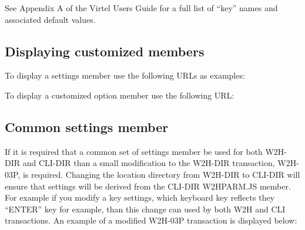 \documentclass[letterpaper,10pt,english]{sphinxmanual}
\begin{document}
\begin{sphinxVerbatim}[commandchars=\\\{\}]
  
\end{sphinxVerbatim}

See Appendix A of the Virtel Users Guide for a full list of “key” names and associated default values.

\ignorespaces 

\subsection{Displaying customized members}
\label{\detokenize{Customization:displaying-customized-members}}\label{\detokenize{Customization:index-1}}
To display a settings member use the following URLs as examples:

\begin{sphinxVerbatim}[commandchars=\\\{\}]
\end{sphinxVerbatim}


To display a customized option member use the following URL:

\begin{sphinxVerbatim}[commandchars=\\\{\}]
\end{sphinxVerbatim}


\ignorespaces 

\subsection{Common settings member}
\label{\detokenize{Customization:common-settings-member}}\label{\detokenize{Customization:index-2}}
If it is required that a common set of settings member be used for both W2H-DIR and CLI-DIR than a small modification to the W2H-DIR transaction, W2H-03P, is required. Changing the location directory from W2H-DIR to CLI-DIR will ensure that settings will be derived from the CLI-DIR W2HPARM.JS member. For example if you modify a key settings, which keyboard key reflects they “ENTER” key for example, than this change can used by both W2H and CLI transactions. An example of a modified W2H-03P transaction is displayed below:
\end{document}

